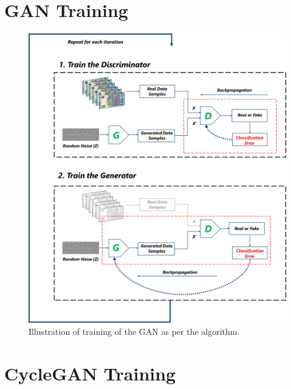 \section{\ac{GAN} Training}
\vspace*{1.5cm}
\begin{figure}[H]
    \begin{center}
	\includegraphics[scale=0.25]{images/generatorAndDiscriminatorTraining.png}
	\caption[Illustration of training of the \ac{GAN} as per the algorithm.]{Illustration of training of the \ac{GAN} as per the algorithm.}
	\label{fig:generatorAndDiscriminatorTraining}
	\end{center}
\end{figure}


\section{\ac{CycleGAN} Training}

